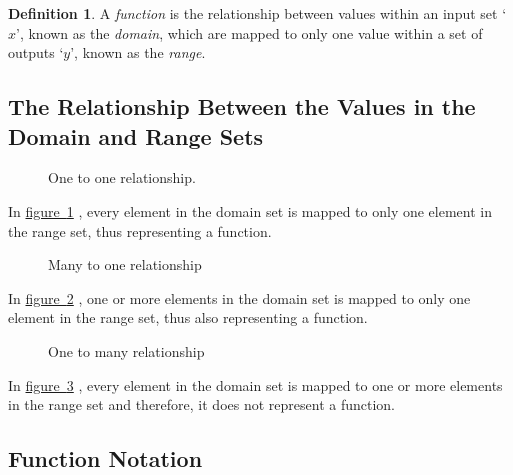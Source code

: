 \documentclass[a5paper,9pt]{book}
\theoremstyle{definition}
\newtheorem*{defn}{Definition}
\newcommand{\fig}[2]{%
    \hyperref[#2]{#1~\ref*{#2}}%
}
\begin{document}
        \begin{defn}
            A \emph{function} is the relationship between values within an input set 
            `$x$', known as the \emph{domain}, which are mapped to only one value within a
            set of outputs `$y$', known as the \emph{range}.
        \end{defn}

        \subsection{The Relationship Between the Values in the Domain and Range Sets}

        \begin{figure}[ht]
            \centering
            
            \caption{One to one relationship.}\label{fig:one_to_one}
        \end{figure}

        In \fig{figure}{fig:one_to_one}, every element in the domain set is mapped to
        only one element in the range set, thus representing a function.

        \bigskip

        \begin{figure}[ht]
            \centering
            
            \caption{Many to one relationship}\label{fig:many_to_one}
        \end{figure}

        In \fig{figure}{fig:many_to_one}, one or more elements in the domain set is mapped
        to only one element in the range set, thus also representing a function.

        \pagebreak

        \begin{figure}[ht]
            \centering
            
            \caption{One to many relationship}\label{fig:one_to_many}
        \end{figure}

        In \fig{figure}{fig:one_to_many}, every element in the domain set is mapped to
        one or more elements in the range set and therefore, it does not represent a function.

        \subsection{Function Notation}
\end{document}
